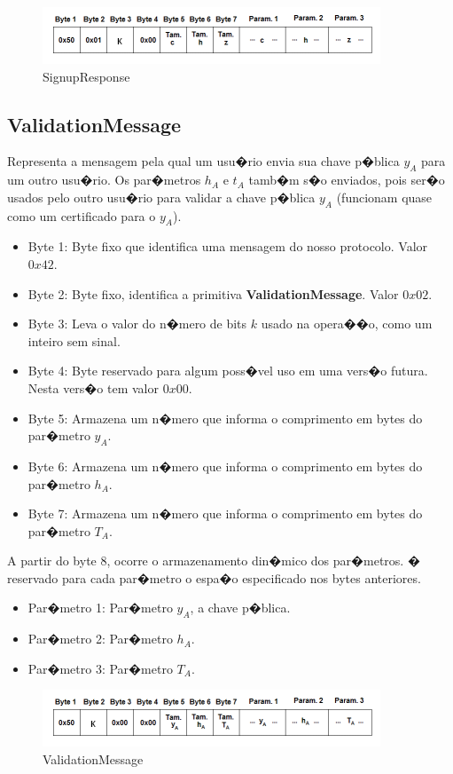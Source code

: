 \documentclass[a4paper,capchap,espacoduplo,normaltoc]{abntepusp}
\begin{document}
\begin{figure}[h]
	\centering
		\includegraphics{figuras/hereisyourqamessage.PNG}
	\caption{SignupResponse}	
	\label{fig:SignupResponse}
\end{figure}

\subsection{ValidationMessage}
Representa a mensagem pela qual um usu�rio envia sua chave p�blica $y_A$ para um outro usu�rio. Os par�metros $h_A$ e $t_A$ tamb�m s�o enviados, pois ser�o usados pelo outro usu�rio para validar a chave p�blica $y_A$ (funcionam quase como um certificado para o $y_A$).

\begin{itemize}
	\item Byte 1: Byte fixo que identifica uma mensagem do nosso protocolo. Valor $0x42$.
	\item Byte 2: Byte fixo, identifica a primitiva \textbf{ValidationMessage}. Valor $0x02$.
	\item Byte 3: Leva o valor do n�mero de bits $k$ usado na opera��o, como um inteiro sem sinal.
	\item Byte 4: Byte reservado para algum poss�vel uso em uma vers�o futura. Nesta vers�o tem valor $0x00$.	
	\item Byte 5: Armazena um n�mero que informa o comprimento em bytes do par�metro $y_A$.
	\item Byte 6: Armazena um n�mero que informa o comprimento em bytes do par�metro $h_A$.
	\item Byte 7: Armazena um n�mero que informa o comprimento em bytes do par�metro $T_A$.
\end{itemize}	
A partir do byte 8, ocorre o armazenamento din�mico dos par�metros. � reservado para cada par�metro o espa�o especificado nos bytes anteriores.
\begin{itemize}
	\item Par�metro 1: Par�metro $y_A$, a chave p�blica.
	\item Par�metro 2: Par�metro $h_A$.
	\item Par�metro 3: Par�metro $T_A$.
\end{itemize}

\begin{figure}[h]
	\centering
		\includegraphics{figuras/authenticationmessage.PNG}
	\caption{ValidationMessage}
	\label{fig:ValidationMessage}
\end{figure}
\end{document}
